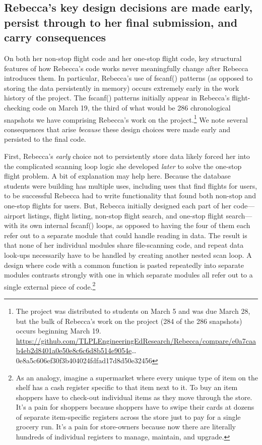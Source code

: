 \subsection{Rebecca's key design decisions are made early, persist through to her final submission, and carry consequences}\label{rebeccas-key-design-decisions-are-made-early-persist-through-to-her-final-submission-and-carry-consequences}

On both her non-stop flight code and her one-stop flight code, key structural features of how Rebecca's code works never meaningfully change after Rebecca introduces them. In particular, Rebecca's use of fscanf() patterns (as opposed to storing the data persistently in memory) occurs extremely early in the work history of the project. The fscanf() patterns initially appear in Rebecca's flight-checking code on March 19, the third of what would be 286 chronological snapshots we have comprising Rebecca's work on the project.\footnote{The project was distributed to students on March 5 and was due March 28, but the bulk of Rebecca's work on the project (284 of the 286 snapshots) occurs beginning March 19. \url{https://github.com/TLPLEngineeringEdResearch/Rebecca/compare/e0a7caab4eb2d8401a0e50e8c6c6d8b514e9054e}\ldots{}0e8a5c606ef30f3b404024fdfad17d8d50e32456} We note several consequences that arise \emph{because} these design choices were made early and persisted to the final code.

First, Rebecca's \emph{early} choice not to persistently store data likely forced her into the complicated scanning loop logic she developed \emph{later} to solve the one-stop flight problem. A bit of explanation may help here. Because the database students were building has multiple uses, including uses that find flights for users, to be successful Rebecca had to write functionality that found both non-stop and one-stop flights for users. But, Rebecca initially designed each part of her code---airport listings, flight listing, non-stop flight search, and one-stop flight search---with its own internal fscanf() loops, as opposed to having the four of them each refer out to a separate module that could handle reading in data. The result is that none of her individual modules share file-scanning code, and repeat data look-ups necessarily have to be handled by creating another nested scan loop. A design where code with a common function is pasted repeatedly into separate modules contrasts strongly with one in which separate modules all refer out to a single external piece of code.\footnote{As an analogy, imagine a supermarket where every unique type of item on the shelf has a cash register specific to that item next to it. To buy an item shoppers have to check-out individual items as they move through the store. It's a pain for shoppers because shoppers have to swipe their cards at dozens of separate item-specific registers across the store just to pay for a single grocery run. It's a pain for store-owners because now there are literally hundreds of individual registers to manage, maintain, and upgrade.}

